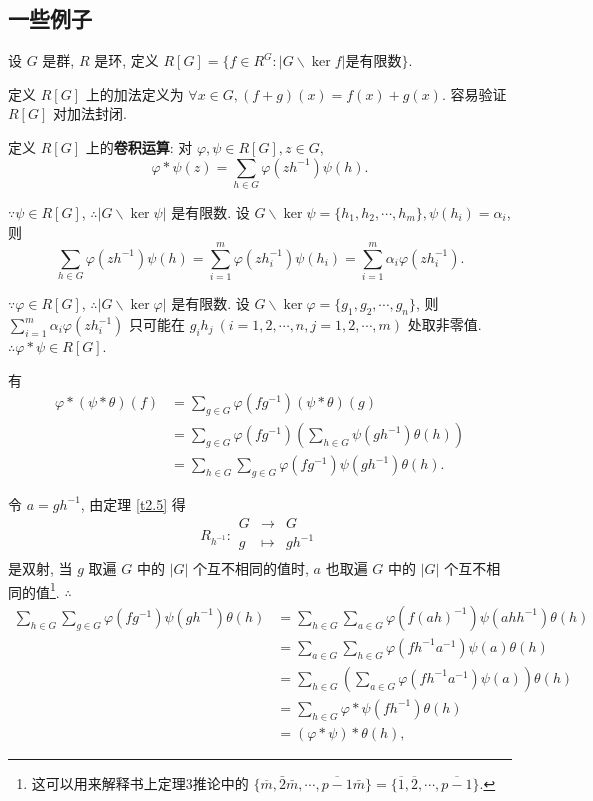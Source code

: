 \documentclass[color=black,device=normal,lang=cn,mode=geye]{elegantnote}
\begin{document}
\subsection{一些例子}
\begin{example}
    设 $G$ 是群, $R$ 是环, 定义 $R[G]=\{f\in R^G:|G\backslash\ker f|\text{是有限数}\}$.
    
    定义 $R[G]$ 上的加法定义为 $\forall x\in G,(f+g)(x)=f(x)+g(x)$. 容易验证 $R[G]$ 对加法封闭.
    
    定义 $R[G]$ 上的\textbf{卷积运算}: 对 $\varphi,\psi\in R[G],z\in G$,
    \[\varphi*\psi(z)=\sum\limits_{h\in G}\varphi(zh^{-1})\psi(h).\]

    $\because\psi\in R[G]$, $\therefore|G\backslash\ker\psi|$ 是有限数. 设 $G\backslash\ker\psi=\{h_1,h_2,\cdots,h_m\},\psi(h_i)=\alpha_i$, 则
    \[\sum\limits_{h\in G}\varphi(zh^{-1})\psi(h)=\sum\limits_{i=1}^m\varphi(zh_i^{-1})\psi(h_i)=\sum\limits_{i=1}^m\alpha_i\varphi(zh_i^{-1}).\]

    $\because\varphi\in R[G]$, $\therefore|G\backslash\ker\varphi|$ 是有限数. 设 $G\backslash\ker\varphi=\{g_1,g_2,\cdots,g_n\}$, 则 $\sum\limits_{i=1}^m\alpha_i\varphi(zh_i^{-1})$ 只可能在 $g_ih_j\ (i=1,2,\cdots,n,j=1,2,\cdots,m)$ 处取非零值. $\therefore\varphi*\psi\in R[G]$.

    有
    \begin{align*}
        \varphi*(\psi*\theta)(f) & =\sum\limits_{g\in G}\varphi(fg^{-1})(\psi*\theta)(g) \\
        & =\sum\limits_{g\in G}\varphi(fg^{-1})\left(\sum\limits_{h\in G}\psi(gh^{-1})\theta(h)\right) \\
        & =\sum\limits_{h\in G}\sum\limits_{g\in G}\varphi(fg^{-1})\psi(gh^{-1})\theta(h).
    \end{align*}

    令 $a=gh^{-1}$, 由定理 \ref{t2.5} 得
    \[R_{h^{-1}}:\begin{array}{rcl}
        G & \to & G \\
        g & \mapsto & gh^{-1} \\
    \end{array}\]
    是双射, 当 $g$ 取遍 $G$ 中的 $|G|$ 个互不相同的值时, $a$ 也取遍 $G$ 中的 $|G|$ 个互不相同的值\footnote{这可以用来解释书上定理3推论中的 $\{\overline{m},\bar{2}\bar{m},\cdots,\overline{p-1}\bar{m}\}=\{\overline{1},\overline{2},\cdots,\overline{p-1}\}$.}. $\therefore$
    \begin{align*}
        \sum\limits_{h\in G}\sum\limits_{g\in G}\varphi(fg^{-1})\psi(gh^{-1})\theta(h) & =\sum\limits_{h\in G}\sum\limits_{a\in G}\varphi(f(ah)^{-1})\psi(ahh^{-1})\theta(h) \\
        & =\sum\limits_{a\in G}\sum\limits_{h\in G}\varphi(fh^{-1}a^{-1})\psi(a)\theta(h) \\
        & =\sum\limits_{h\in G}\left(\sum\limits_{a\in G}\varphi(fh^{-1}a^{-1})\psi(a)\right)\theta(h) \\
        & =\sum\limits_{h\in G}\varphi*\psi(fh^{-1})\theta(h) \\
        & =(\varphi*\psi)*\theta(h),
    \end{align*}


\end{example}
\end{document}
